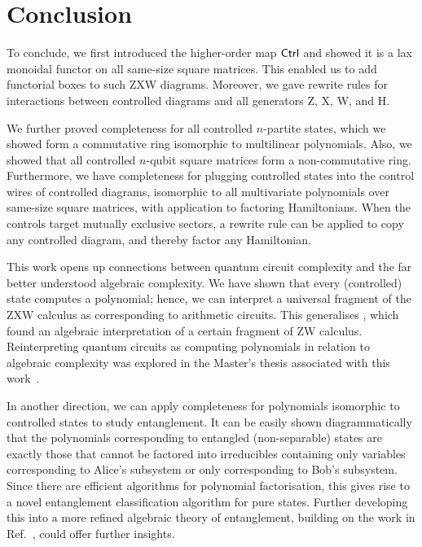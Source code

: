 \section{Conclusion}
To conclude, we first introduced the higher-order map $\textsf{Ctrl}$ and showed it is a lax monoidal functor on all same-size square matrices. This enabled us to add functorial boxes to such ZXW diagrams. Moreover, we gave rewrite rules for interactions between controlled diagrams and all generators Z, X, W, and H.

We further proved completeness for all controlled $n$-partite states, which we showed form a commutative ring isomorphic to multilinear polynomials. Also, we showed that all controlled $n$-qubit square matrices form a non-commutative ring. Furthermore, we have completeness for plugging controlled states into the control wires of controlled diagrams, isomorphic to all multivariate polynomials over same-size square matrices, with application to factoring Hamiltonians. When the controls target mutually exclusive sectors, a rewrite rule can be applied to copy any controlled diagram, and thereby factor any Hamiltonian.

This work opens up connections between quantum circuit complexity and the far better understood algebraic complexity.
We have shown that every (controlled) state computes a polynomial; hence, we can interpret a universal fragment of the ZXW calculus as corresponding to arithmetic circuits. This generalises \cite{carette2023compositionality}, which found an algebraic interpretation of a certain fragment of ZW calculus. Reinterpreting quantum circuits as computing polynomials in relation to algebraic complexity was explored in the Master's thesis associated with this work~\cite{Agnew2023Masters}.

In another direction, we can apply completeness for polynomials isomorphic to controlled states to study entanglement. It can be easily shown diagrammatically that the polynomials corresponding to entangled (non-separable) states are exactly those that cannot be factored into irreducibles containing only variables corresponding to Alice's subsystem or only corresponding to Bob's subsystem. Since there are efficient algorithms for polynomial factorisation, this gives rise to a novel entanglement classification algorithm for pure states. Further developing this into a more refined algebraic theory of entanglement, building on the work in Ref.~\cite{Agnew2023Masters}, could offer further insights.

